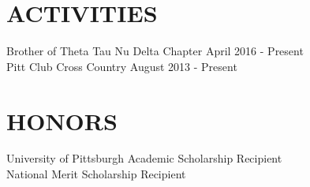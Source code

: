 \documentclass[line, margin]{res}
\begin{document}
\begin{resume}
\section{ACTIVITIES}
Brother of Theta Tau Nu Delta Chapter \hfill April 2016 - Present \\
Pitt Club Cross Country \hfill August 2013 - Present

\section{HONORS}
University of Pittsburgh Academic Scholarship Recipient \\
National Merit Scholarship Recipient


\end{resume}
\end{document}
